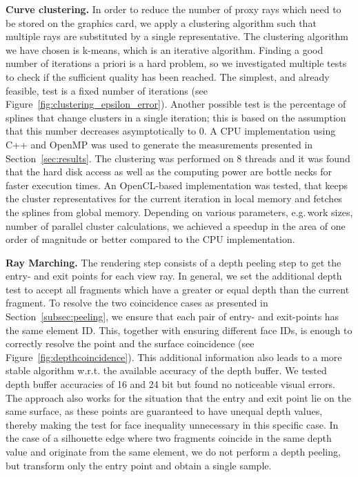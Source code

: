 \documentclass[journal]{vgtc}                %
\begin{document}
\noindent \textbf{Curve clustering.} In order to reduce the number of proxy rays which need to be stored on the graphics card, we apply a clustering algorithm such that multiple rays are substituted by a single representative. The clustering algorithm we have chosen is k-means, which is an iterative algorithm. Finding a good number of iterations a priori is a hard problem, so we investigated multiple tests to check if the sufficient quality has been reached. The simplest, and already feasible, test is a fixed number of iterations (see Figure~\ref{fig:clustering_epsilon_error}). Another possible test is the percentage of splines that change clusters in a single iteration; this is based on the assumption that this number decreases asymptotically to 0. A CPU implementation using C++ and OpenMP was used to generate the measurements presented in Section~\ref{sec:results}. The clustering was performed on 8 threads and it was found that the hard disk access as well as the computing power are bottle necks for faster execution times. An OpenCL-based implementation was tested, that keeps the cluster representatives for the current iteration in local memory and fetches the splines from global memory. Depending on various parameters, e.g.\,work sizes, number of parallel cluster calculations, we achieved a speedup in the area of one order of magnitude or better compared to the CPU implementation.

\noindent \textbf{Ray Marching.} The rendering step consists of a depth peeling step to get the entry- and exit points for each view ray. In general, we set the additional depth test to accept all fragments which have a greater or equal depth than the current fragment. To resolve the two coincidence cases as presented in Section~\ref{subsec:peeling}, we ensure that each pair of entry- and exit-points has the same element ID. This, together with ensuring different face IDs, is enough to correctly resolve the point and the surface coincidence (see Figure~\ref{fig:depthcoincidence}). This additional information also leads to a more stable algorithm w.r.t. the available accuracy of the depth buffer. We tested depth buffer accuracies of 16 and 24 bit but found no noticeable visual errors. The approach also works for the situation that the entry and exit point lie on the same surface, as these points are guaranteed to have unequal depth values, thereby making the test for face inequality unnecessary in this specific case. In the case of a silhouette edge where two fragments coincide in the same depth value and originate from the same element, we do not perform a depth peeling, but transform only the entry point and obtain a single sample.
\end{document}
